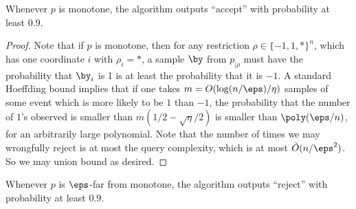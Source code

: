 \begin{lemma}
    Whenever $p$ is monotone, the algorithm outputs ``accept'' with probability at least $0.9$.
\end{lemma}

\begin{proof}
    Note that if $p$ is monotone, then for any restriction $\rho \in \{-1, 1, *\}^n$, which has one coordinate $i$ with $\rho_i = *$, a sample $\by$ from $p_{|\rho}$ must have the probability that $\by_i$ is 1 is at least the probability that it is $-1$. A standard Hoeffding bound implies that if one takes $m = O(\log(n/\eps)/\eta)$ samples of some event which is more likely to be $1$ than $-1$, the probability that the number of $1$'s observed is smaller than $m (1/2 - \sqrt{\eta}/2)$ is smaller than $\poly(\eps / n)$, for an arbitrarily large polynomial. Note that the number of times we may wrongfully reject is at most the query complexity, which is at most $\tilde{O}(n/\eps^2)$. So we may union bound as desired.
\end{proof}

\begin{lemma}\label{lem:far-case-reject}
    Whenever $p$ is $\eps$-far from monotone, the algorithm outputs ``reject'' with probability at least $0.9$.
\end{lemma}

